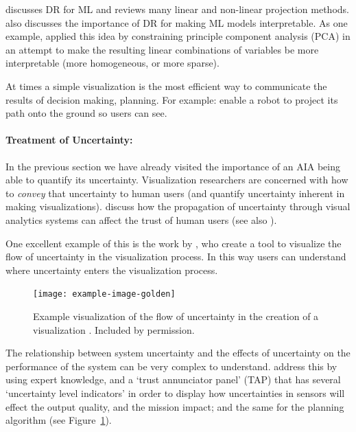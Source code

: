 \citet{Venna2007-yj} discusses DR for ML and reviews many linear and non-linear projection methods. \citet{Vellido2012-nm} also discusses the importance of DR for making ML models interpretable. As one example, \citet{Chipman2005-om} applied this idea by constraining principle component analysis (PCA) in an attempt to make the resulting linear combinations of variables be more interpretable (more homogeneous, or more sparse).

At times a simple visualization is the most efficient way to communicate the results of decision making, planning. For example: \citet{Chadalavada2015-wx} enable a robot to project its path onto the ground so users can see.

\paragraph{Treatment of Uncertainty:}
In the previous section we have already visited the importance of an AIA being able to quantify its uncertainty. Visualization researchers are concerned with how to \emph{convey} that uncertainty to human users (and quantify uncertainty inherent in making visualizations). \cite{Sacha2016-tu} discuss how the propagation of uncertainty through visual analytics systems can affect the trust of human users (see also \cite{Correa2009-hi}).

One excellent example of this is the work by \citet{Wu2012-qi}, who create a tool to visualize the flow of uncertainty in the visualization process. In this way users can understand where uncertainty enters the visualization process.

\begin{figure}[htpb]
    \centering
    \texttt{[image: example-image-golden]}
    \caption{Example visualization of the flow of uncertainty in the creation of a visualization \cite{Wu2012-qi}. Included by permission.}
    \label{fig:hutchins_fig}
\end{figure}

The relationship between system uncertainty and the effects of uncertainty on the performance of the system can be very complex to understand. \citet{Hutchins2015-if} address this by using expert knowledge, and a `trust annunciator panel' (TAP) that has several `uncertainty level indicators' in order to display how uncertainties in sensors will effect the output quality, and the mission impact; and the same for the planning algorithm (see Figure~\ref{fig:hutchins_fig}).

